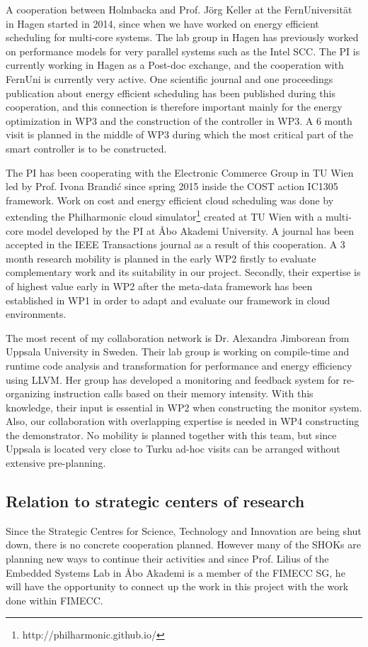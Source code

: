 \documentclass{article}
\begin{document}
A cooperation between Holmbacka and Prof. J\"{o}rg Keller at the FernUniversit\"{a}t in Hagen started in 2014, since when we have worked on energy efficient scheduling for multi-core systems. 
The lab group in Hagen has previously worked on performance models for very parallel systems such as the Intel SCC.
The PI is currently working in Hagen as a Post-doc exchange, and the cooperation with FernUni is currently very active.
One scientific journal and one proceedings publication about energy efficient scheduling has been published during this cooperation,
and this connection is therefore important mainly for the energy optimization in WP3 and the construction of the controller in WP3.
A 6 month visit is planned in the middle of WP3 during which the most critical part of the smart controller is to be constructed.
\smallskip

The PI has been cooperating with the Electronic Commerce Group in TU Wien led by Prof. Ivona Brandi\'{c} since spring 2015 inside the COST action IC1305 framework. 
Work on cost and energy efficient cloud scheduling was done by extending the Philharmonic cloud simulator\footnote{http://philharmonic.github.io/} created at TU Wien with a multi-core model developed by the PI at \AA{}bo Akademi University. 
A journal has been accepted in the IEEE Transactions journal as a result of this cooperation.
A 3 month research mobility is planned in the early WP2 firstly to evaluate complementary work and its suitability in our project.
Secondly, their expertise is of highest value early in WP2 after the meta-data framework has been established in WP1 in order to adapt and evaluate our framework in cloud environments.
\smallskip 

The most recent of my collaboration network is Dr. Alexandra Jimborean from Uppsala University in Sweden.
Their lab group is working on compile-time and runtime code analysis and transformation for performance and energy efficiency using LLVM.
Her group has developed a monitoring and feedback system for re-organizing instruction calls based on their memory intensity.
With this knowledge, their input is essential in WP2 when constructing the monitor system.
Also, our collaboration with overlapping expertise is needed in WP4 constructing the demonstrator.
No mobility is planned together with this team, but since Uppsala is located very close to Turku ad-hoc visits can be arranged without extensive pre-planning.


\subsection{Relation to strategic centers of research}
Since the Strategic Centres for Science, Technology and Innovation are being shut down, there is no concrete cooperation planned. 
However many of the SHOKs are planning new ways to continue their activities and since Prof. Lilius of the Embedded Systems Lab in \AA{}bo Akademi is a member of the FIMECC SG, 
he will have the opportunity to connect up the work in this project with the work done within FIMECC.
\end{document}
